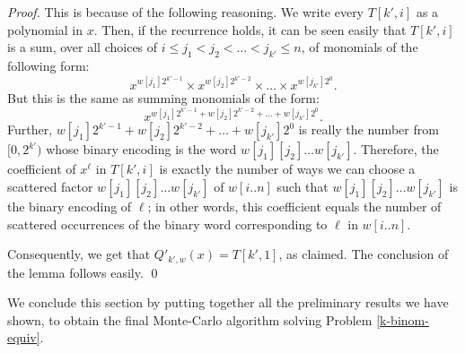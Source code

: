 \documentclass[runningheads]{llncs}
\begin{document}
\begin{proof}
This is because of the following reasoning. We write every $T[k',i]$ as a polynomial in $x$. Then, if the recurrence holds, it can be seen easily that
$T[k',i]$ is a sum, over all choices of $i\leq j_{1} < j_{2} < \dots < j_{k'}\leq n$, of monomials of the following form:
$$x^{w[j_{1}]2^{k'-1}} \times x^{w[j_{2}]2^{k'-2}} \times \dots \times x^{w[j_{k'}]2^{0}}.$$ 
But this is the same as summing monomials of the form:
$$x^{w[{j_{1}}]2^{k'-1}+w[{j_{2}}]2^{k'-2}+\dots+w[{j_{k'}}]2^{0}}.$$
Further, $w[{j_{1}}]2^{k'-1}+w[{j_{2}}]2^{k'-2}+\dots+w[{j_{k'}}]2^{0}$ is really the number from $[0,2^{k'})$ whose binary encoding is the word $w[j_{1}][j_{2}]\dots w[j_{k'}]$. 
Therefore, the coefficient of $x^{\ell}$ in $T[k',i]$ is exactly the number of ways we can choose a scattered factor $w[j_{1}][j_{2}]\dots w[j_{k'}]$ of $w[i..n]$ such that $w[j_{1}][j_{2}]\dots w[j_{k'}]$ is the binary encoding of $\ell$; in other words, this coefficient equals the number of scattered occurrences of the binary word corresponding to $\ell$ in $w[i.. n]$.

Consequently, we get that $Q'_{k',w}(x)=T[k',1]$, as claimed. The conclusion of the lemma follows easily.
\qed \end{proof}

We conclude this section by putting together all the preliminary results we have shown, to obtain the final Monte-Carlo algorithm solving Problem \ref{k-binom-equiv}.



\vskip 0.2cm  \begin{small}
    \begin{center}
  \end{center}
  \end{small}
  
\end{document}
